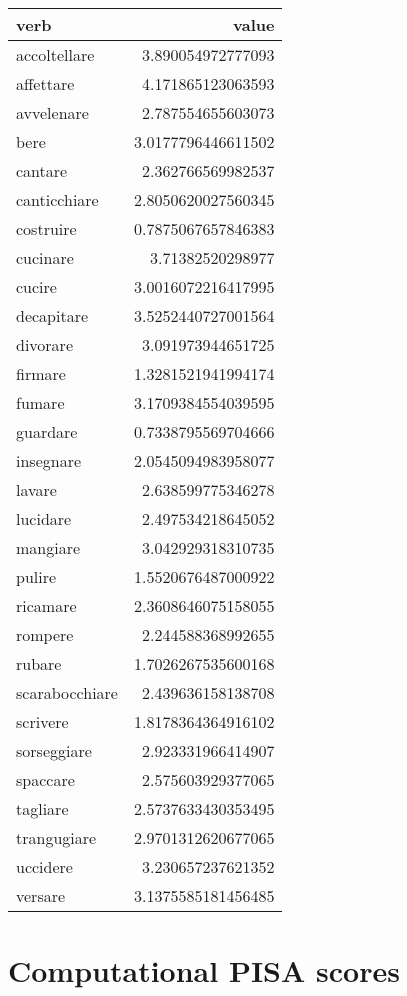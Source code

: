 \begin{longtable}{l|r}
\textbf{verb}     & \textbf{value}    \\
\hline
\endhead
accoltellare   & 3.890054972777093  \\
affettare      & 4.171865123063593  \\
avvelenare     & 2.787554655603073  \\
bere           & 3.0177796446611502 \\
cantare        & 2.362766569982537  \\
canticchiare   & 2.8050620027560345 \\
costruire      & 0.7875067657846383 \\
cucinare       & 3.71382520298977   \\
cucire         & 3.0016072216417995 \\
decapitare     & 3.5252440727001564 \\
divorare       & 3.091973944651725  \\
firmare        & 1.3281521941994174 \\
fumare         & 3.1709384554039595 \\
guardare       & 0.7338795569704666 \\
insegnare      & 2.0545094983958077 \\
lavare         & 2.638599775346278  \\
lucidare       & 2.497534218645052  \\
mangiare       & 3.042929318310735  \\
pulire         & 1.5520676487000922 \\
ricamare       & 2.3608646075158055 \\
rompere        & 2.244588368992655  \\
rubare         & 1.7026267535600168 \\
scarabocchiare & 2.439636158138708  \\
scrivere       & 1.8178364364916102 \\
sorseggiare    & 2.923331966414907  \\
spaccare       & 2.575603929377065  \\
tagliare       & 2.5737633430353495 \\
trangugiare    & 2.9701312620677065 \\
uccidere       & 3.230657237621352  \\
versare        & 3.1375585181456485
\end{longtable}


\section{Computational PISA scores} 

